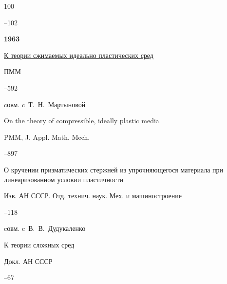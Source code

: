\begin{thebibliography}{100}

–102




\item[] \centerline{\bf 1963}




\paper \href{https://zbmath.org/?q=an:0131.39605}{К теории сжимаемых идеально пластических сред}

\jour ПММ 




–592 

\miscnote cовм. c~Т.~Н.~Мартыновой


\transl


\paper On the theory of compressible, ideally plastic media

\jour PMM, J. Appl. Math. Mech.


--897 








\paper О кручении призматических стержней из упрочняющегося материала при линеаризованном условии пластичности 

\jour Изв. АН СССР. Отд. технич. наук. Мех. и машиностроение



–118 

\miscnote cовм. c~В.~В.~Дудукаленко




\paper К теории сложных сред 

\jour Докл. АН СССР




–67




\end{thebibliography}
